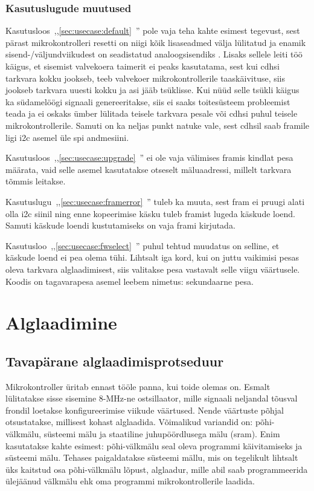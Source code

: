 \documentclass[12pt,a4paper]{article}
\begin{document}
\subsubsection{Kasutuslugude muutused}
Kasutusloos~,,\ref{sec:usecase:default}~'' pole
vaja teha kahte esimest tegevust, sest pärast mikrokontrolleri resetti on niigi
kõik lisaseadmed välja lülitatud ja enamik sisend-/väljundviikudest on
seadistatud analoogsisendiks \cite{f1rm,f2rm}. Lisaks sellele leiti töö käigus,
et sisemist valvekoera taimerit ei peaks kasutatama, sest kui \gls{cdhs}i
tarkvara kokku jookseb, teeb valvekoer mikrokontrollerile taaskäivituse, siis
jookseb tarkvara uuesti kokku ja asi jääb tsüklisse. Kui nüüd selle tsükli
käigus ka südamelöögi signaali genereeritakse, siis ei saaks toitesüsteem
probleemist teada ja ei oskaks ümber lülitada teisele tarkvara pesale või
\gls{cdhs}i puhul teisele mikrokontrollerile. Samuti on ka neljas punkt natuke
vale, sest \gls{cdhs}il saab \gls{fram}ile ligi \gls{i2c} asemel üle \gls{spi}
andmesiini.

Kasutusloos~,,\ref{sec:usecase:upgrade}~'' ei ole
vaja välimises \gls{fram}is kindlat pesa määrata, vaid selle asemel kasutatakse
otseselt mäluaadressi, millelt tarkvara tõmmis leitakse.

Kasutuslugu~,,\ref{sec:usecase:framerror}~''
tuleb ka muuta, sest \gls{fram} ei pruugi alati olla \gls{i2c} siinil ning enne
kopeerimise käsku tuleb \gls{fram}ist lugeda käskude loend. Samuti käskude
loendi kustutamiseks on vaja \gls{fram}i kirjutada.

Kasutusloo~,,\ref{sec:usecase:fwselect}~'' puhul
tehtud muudatus on selline, et käskude loend ei pea olema tühi. Lihtsalt iga
kord, kui on juttu vaikimisi pesas oleva tarkvara alglaadimisest, siis valitakse
pesa vastavalt selle viigu väärtusele. Koodis on tagavarapesa asemel leebem
nimetus: sekundaarne pesa.

\section{Alglaadimine}
\label{sec:boot}
\subsection{Tavapärane alglaadimisprotseduur}
\label{sec:boot:tava}
Mikrokontroller üritab ennast tööle panna, kui toide olemas on. Esmalt
lülitatakse sisse sisemine 8-MHz-ne ostsillaator, mille signaali neljandal
tõusval frondil loetakse konfigureerimise viikude väärtused. Nende väärtuste
põhjal otsustatakse, millisest kohast alglaadida. Võimalikud variandid on:
põhi-välkmälu, süsteemi mälu ja staatiline juhupöördlusega mälu (\gls{sram}).
Enim kasutatakse kahte esimest: põhi-välkmälu seal oleva programmi käivitamiseks
ja süsteemi mälu. Tehases paigaldatakse süsteemi mällu, mis on tegelikult
lihtsalt üks kaitstud osa põhi-välkmälu lõpust, alglaadur, mille abil saab
programmeerida ülejäänud välkmälu ehk oma programmi mikrokontrollerile laadida.
\end{document}
